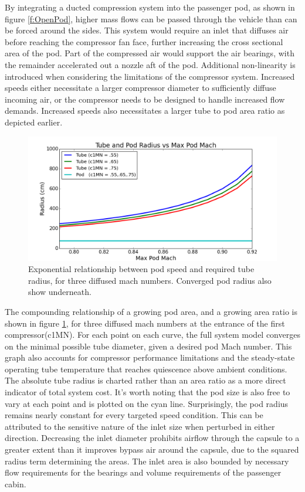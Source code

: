 \documentclass[heading.tex]{subfiles}
\begin{document}
By integrating a ducted compression system into the passenger pod, as shown in figure \ref{f:OpenPod},
higher mass flows can be passed through the vehicle than can be forced around the sides.
This system would require an inlet that diffuses air before reaching the compressor fan face,
further increasing the cross sectional area of the pod.
Part of the compressed air would support the air bearings, with the remainder accelerated out a nozzle aft of the pod.
Additional non-linearity is introduced when considering the limitations of the compressor system.
Increased speeds either necessitate a larger compressor diameter to sufficiently diffuse incoming air,
or the compressor needs to be designed to handle increased flow demands.
Increased speeds also necessitates a larger tube to pod area ratio as depicted earlier.

\begin{figure}[H]
\centering
\includegraphics[width=\textwidth]{images/mach_vs_rad4.png}
\caption[Tube and Pod Radius vs Mach]{Exponential relationship between pod speed and required tube radius, for three diffused mach numbers.
Converged pod radius also show underneath. }
\label{f:machRAD}
\end{figure}

The compounding relationship of a growing pod area, and a growing area ratio is
shown in figure \ref{f:machRAD}, for three diffused mach numbers at the entrance of the first compressor(c1MN).
For each point on each curve, the full system model converges on the minimal possible tube diameter, given a desired pod Mach number.
This graph also accounts for compressor performance limitations and the steady-state operating tube temperature
that reaches quiescence above ambient conditions.
The absolute tube radius is charted rather than an area ratio as a more direct indicator of total system cost.
It's worth noting that the pod size is also free to vary at each point and is plotted on the cyan line.
Surprisingly, the pod radius remains nearly constant for every targeted speed condition.
This can be attributed to the sensitive nature of the inlet size when perturbed in either direction.
Decreasing the inlet diameter prohibits airflow through the capsule to a greater extent than it improves bypass air around the capsule,
due to the squared radius term determining the areas.
The inlet area is also bounded by necessary flow requirements for the bearings and volume requirements of the passenger cabin.
\end{document}
